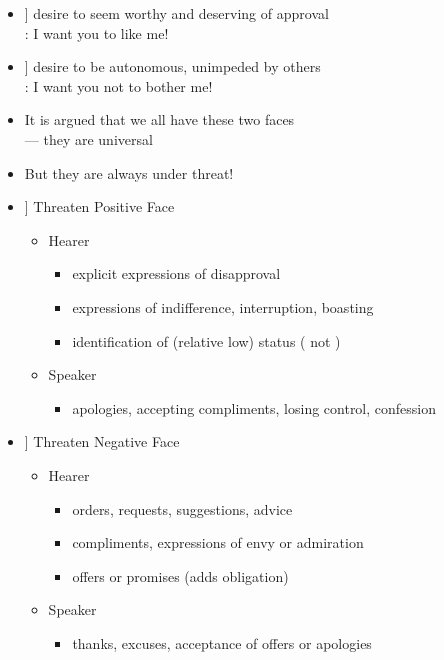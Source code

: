 \documentclass[headrule,footrule]{foils}
\newcommand{\PF}[1]{\Smiley[#1][green]}
\newcommand{\NF}[1]{\Annoey[#1][red]}
\begin{document}
\begin{itemize}
\item[\PF{2}]  desire to seem worthy and deserving of approval
  \\ : I want you to like me!
\bigskip\bigskip\bigskip
\item[\NF{2}]  desire to be autonomous, unimpeded by others
  \\ : I want you not to bother me!
\bigskip\bigskip\bigskip
\item It is argued that we all have these two faces
  \\ --- they are universal
\item But they are always under threat!

\end{itemize}


\begin{itemize}\addtolength{\itemsep}{-1ex}
\item[\PF{1}] Threaten Positive Face
  \begin{itemize}
  \item Hearer
    \begin{itemize}
    \item explicit expressions of disapproval 
    \item expressions of indifference, interruption, boasting
    \item identification of (relative low) status ( not )
    \end{itemize}
  \item Speaker
    \begin{itemize}
    \item apologies, accepting  compliments, losing control, confession
    \end{itemize}
  \end{itemize}
\item[\NF{1}] Threaten Negative Face
  \begin{itemize}
  \item Hearer
    \begin{itemize}
    \item orders, requests, suggestions, advice
    \item compliments, expressions of envy or admiration
    \item offers or promises (adds obligation)
    \end{itemize}
  \item Speaker
    \begin{itemize}
    \item thanks, excuses, acceptance of offers or apologies
    \end{itemize}
  \end{itemize}
\end{itemize}
\end{document}
